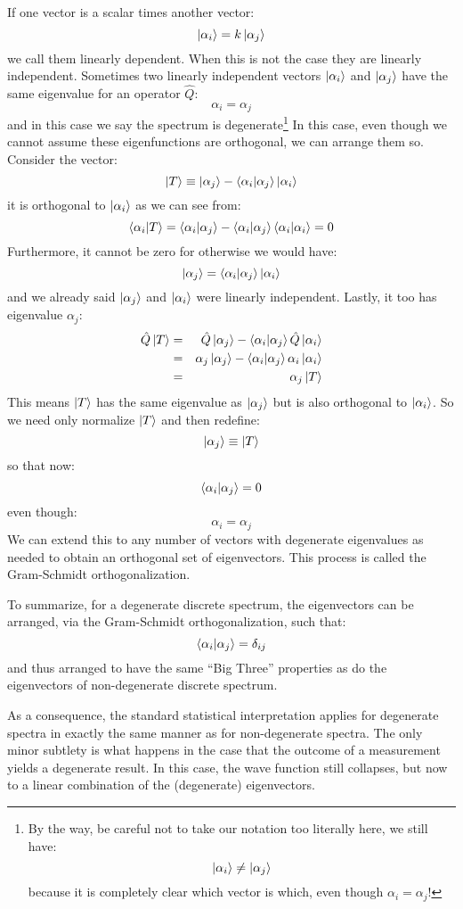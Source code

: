 \documentclass[12pt]{book}
\begin{document}
If one vector is a scalar times another vector:
$$\ket{\alpha_i} = k \ket{\alpha_j}$$
we call them linearly dependent.  When this is not the case they are linearly independent.
Sometimes two linearly independent vectors $\ket{\alpha_i}$ and $\ket{\alpha_j}$ have the same eigenvalue for an operator $\hat{Q}$:
$$\alpha_i = \alpha_j$$
and in this case we say the spectrum is degenerate\footnote{By the way, be careful not to take our notation too literally here, we still have:
$$\ket{\alpha_i} \neq \ket{\alpha_j}$$
because it is completely clear which vector is which, even though $\alpha_i=\alpha_j$!}
In this case, even though we cannot assume these eigenfunctions are orthogonal, we can arrange them so.  Consider the vector:
$$\ket{T} \equiv \ket{\alpha_j} - \braket{\alpha_i|\alpha_j}\ket{\alpha_i}$$
it is orthogonal to $\ket{\alpha_i}$ as we can see from:
$$\braket{\alpha_i| T} = \braket{\alpha_i | \alpha_j} - \braket{\alpha_i|\alpha_j} \braket{\alpha_i|\alpha_i} = 0$$
Furthermore, it cannot be zero for otherwise we would have:
$$\ket{\alpha_j} = \braket{\alpha_i|\alpha_j}\ket{\alpha_i}$$
and we already said $\ket{\alpha_j}$ and $\ket{\alpha_i}$ were linearly independent.
Lastly, it too has eigenvalue $\alpha_j$:
\begin{eqnarray*}
\hat{Q}\ket{T} &=& \hat{Q}\ket{\alpha_j} - \braket{\alpha_i|\alpha_j}\hat{Q}\ket{\alpha_i}\\
&=&\alpha_j \ket{\alpha_j} - \braket{\alpha_i|\alpha_j} \alpha_i \ket{\alpha_i}\\
&=& \alpha_j \ket{T}\\
\end{eqnarray*}
This means $\ket{T}$ has the same eigenvalue as $\ket{\alpha_j}$ but is also orthogonal to $\ket{\alpha_i}$.  So we need only normalize $\ket{T}$ and then redefine:
$$\ket{\alpha_j} \equiv \ket{T}$$
so that now:
$$\braket{\alpha_i | \alpha_j} = 0$$
even though:
$$\alpha_i = \alpha_j$$
We can extend this to any number of vectors with degenerate eigenvalues as needed to obtain an orthogonal set of eigenvectors.  This process is called the Gram-Schmidt orthogonalization. 

To summarize, for a degenerate discrete spectrum, the eigenvectors can be arranged, via the Gram-Schmidt orthogonalization, such that:
$$\braket{\alpha_i | \alpha_j} = \delta_{ij}$$
and thus arranged to have the same ``Big Three'' properties as do the eigenvectors of non-degenerate discrete spectrum.

As a consequence, the standard statistical interpretation applies for degenerate spectra in exactly the same manner as for non-degenerate spectra.  The only minor subtlety is what happens in the case that the outcome of a measurement yields a degenerate result.  In this case, the wave function still collapses, but now to a linear combination of the (degenerate) eigenvectors.
\end{document}
